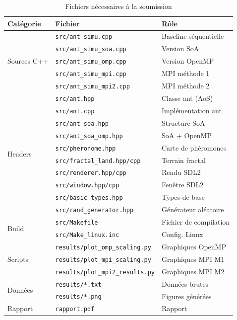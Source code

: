 \documentclass[11pt,a4paper]{article}
\begin{document}
\begin{table}[H]
\centering
\begin{tabular}{lll}
\toprule
\textbf{Catégorie} & \textbf{Fichier} & \textbf{Rôle} \\
\midrule
\multirow{5}{*}{Sources C++}
    & \texttt{src/ant\_simu.cpp}      & Baseline séquentielle \\
    & \texttt{src/ant\_simu\_soa.cpp}  & Version SoA \\
    & \texttt{src/ant\_simu\_omp.cpp}  & Version OpenMP \\
    & \texttt{src/ant\_simu\_mpi.cpp}  & MPI méthode 1 \\
    & \texttt{src/ant\_simu\_mpi2.cpp} & MPI méthode 2 \\
\midrule
\multirow{10}{*}{Headers}
    & \texttt{src/ant.hpp}             & Classe ant (AoS) \\
    & \texttt{src/ant.cpp}             & Implémentation ant \\
    & \texttt{src/ant\_soa.hpp}        & Structure SoA \\
    & \texttt{src/ant\_soa\_omp.hpp}   & SoA + OpenMP \\
    & \texttt{src/pheronome.hpp}       & Carte de phéromones \\
    & \texttt{src/fractal\_land.hpp/cpp} & Terrain fractal \\
    & \texttt{src/renderer.hpp/cpp}    & Rendu SDL2 \\
    & \texttt{src/window.hpp/cpp}      & Fenêtre SDL2 \\
    & \texttt{src/basic\_types.hpp}    & Types de base \\
    & \texttt{src/rand\_generator.hpp} & Générateur aléatoire \\
\midrule
\multirow{2}{*}{Build}
    & \texttt{src/Makefile}            & Fichier de compilation \\
    & \texttt{src/Make\_linux.inc}     & Config. Linux \\
\midrule
\multirow{3}{*}{Scripts}
    & \texttt{results/plot\_omp\_scaling.py}  & Graphiques OpenMP \\
    & \texttt{results/plot\_mpi\_scaling.py}  & Graphiques MPI M1 \\
    & \texttt{results/plot\_mpi2\_results.py} & Graphiques MPI M2 \\
\midrule
\multirow{2}{*}{Données}
    & \texttt{results/*.txt}           & Données brutes \\
    & \texttt{results/*.png}           & Figures générées \\
\midrule
Rapport
    & \texttt{rapport.pdf}            & Rapport \\
\bottomrule
\end{tabular}
\caption{Fichiers nécessaires à la soumission}
\label{tab:files}
\end{table}
\end{document}
